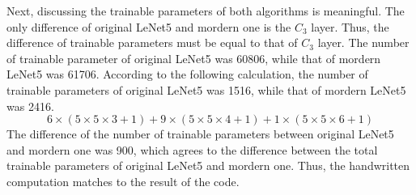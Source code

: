 \documentclass[10pt]{article}
\begin{document}
Next, discussing the trainable parameters of both algorithms is meaningful. The only difference of original LeNet5 and mordern one is the $C_3$ layer. Thus, the difference of trainable parameters must be equal to that of $C_3$ layer. 
The number of trainable parameter of original LeNet5 was 60806, while that of mordern LeNet5 was 61706. According to the following calculation, the number of trainable parameters of original LeNet5 was 1516, while that of mordern LeNet5 was 2416.
\begin{equation*}
    6\times (5\times5\times3 + 1) + 9\times(5\times5\times4+1) + 1\times(5\times5\times6 + 1)
\end{equation*}
The difference of the number of trainable parameters between original LeNet5 and mordern one was 900, which agrees to the difference between the total trainable parameters of original LeNet5 and mordern one.
Thus, the handwritten computation matches to the result of the code. 
\end{document}
